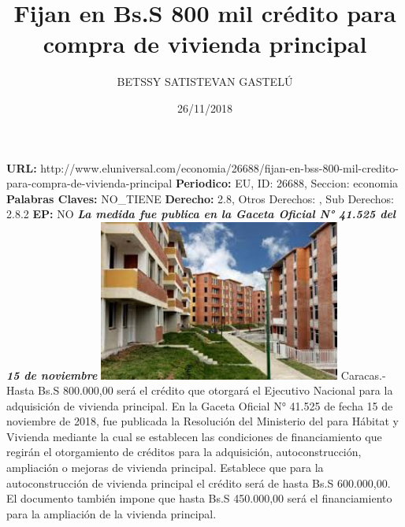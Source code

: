 \documentclass{article}%
\title{\textbf{Fijan en Bs.S 800 mil crédito para compra de vivienda principal}}%
\author{BETSSY SATISTEVAN GASTELÚ}%
\date{26/11/2018}%
\begin{document}
%
\normalsize%
\maketitle%
\textbf{URL: }%
http://www.eluniversal.com/economia/26688/fijan{-}en{-}bss{-}800{-}mil{-}credito{-}para{-}compra{-}de{-}vivienda{-}principal\newline%
%
\textbf{Periodico: }%
EU, %
ID: %
26688, %
Seccion: %
economia\newline%
%
\textbf{Palabras Claves: }%
NO\_TIENE\newline%
%
\textbf{Derecho: }%
2.8, %
Otros Derechos: %
, %
Sub Derechos: %
2.8.2\newline%
%
\textbf{EP: }%
NO\newline%
\newline%
%
\textbf{\textit{La medida fue publica en la Gaceta Oficial N° 41.525 del 15 de noviembre}}%
\newline%
\newline%
%
\includegraphics[width=300px]{218.jpg}%
\newline%
%
Caracas.{-} Hasta Bs.S 800.000,00 será el  crédito que otorgará el Ejecutivo Nacional para la adquisición de vivienda principal.\newline%
\newline%
En la Gaceta Oficial N° 41.525 de fecha 15 de noviembre de 2018, fue publicada la Resolución del Ministerio del para Hábitat y Vivienda mediante la cual se establecen las condiciones de financiamiento que regirán el otorgamiento de créditos para la adquisición, autoconstrucción, ampliación o mejoras de vivienda principal.\newline%
\newline%
Establece que para la autoconstrucción de vivienda principal el crédito será de hasta Bs.S 600.000,00.%
\newline%
%
El documento también impone que hasta Bs.S 450.000,00  será el financiamiento para  la ampliación de la vivienda principal.\newline%
\end{document}
